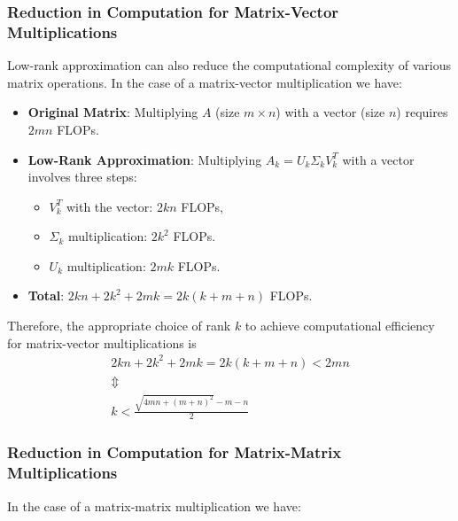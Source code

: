     \subsubsection{Reduction in Computation for Matrix-Vector Multiplications}
    
    Low-rank approximation can also reduce the computational complexity of various matrix operations. In the case of a matrix-vector multiplication we have:
    
    \begin{itemize}
        \item \textbf{Original Matrix}: Multiplying $A$ (size $m \times n$) with a vector (size $n$) requires $2mn$ FLOPs.
        \item \textbf{Low-Rank Approximation}: Multiplying $A_k = U_k \Sigma_k V_k^T$ with a vector involves three steps:
        \begin{itemize}
            \item $V_k^T$ with the vector: $2kn$ FLOPs,
            \item $\Sigma_k$ multiplication: $2k^2$ FLOPs.
            \item $U_k$ multiplication: $2mk$ FLOPs.
        \end{itemize}
        \item \textbf{Total}: $2kn + 2k^2 + 2mk = 2k(k + m + n)$ FLOPs.
    \end{itemize}
    Therefore, the appropriate choice of rank \(k\) to achieve computational efficiency for matrix-vector multiplications is
    \begin{gather*}
        2kn + 2k^2 + 2mk = 2k(k + m + n) < 2mn \\
        \Updownarrow \\
        k < \frac{\sqrt{4mn + (m+n)^2} - m - n}{2}
    \end{gather*}
    
    \subsubsection{Reduction in Computation for Matrix-Matrix Multiplications}
    In the case of a matrix-matrix multiplication we have:
    
